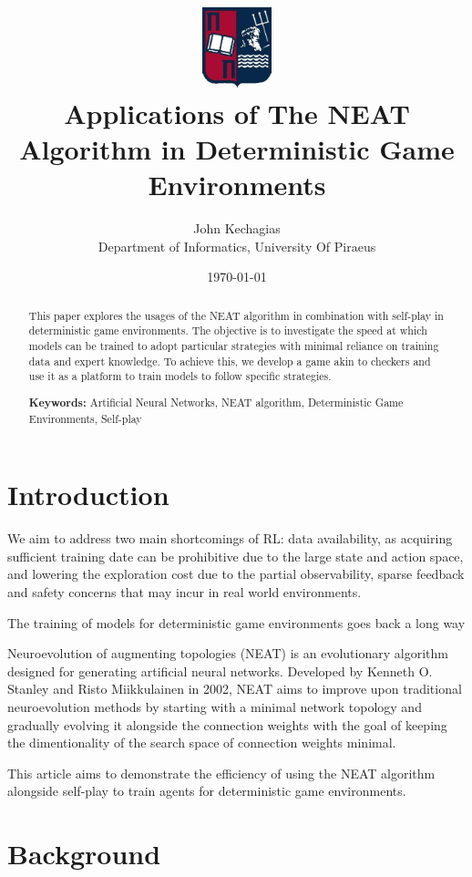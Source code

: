 \documentclass[letterpaper, 12pt]{article}
\title{
  \includegraphics[width=2cm]{unipi_logo.png}\\[1cm]
  Applications of The NEAT Algorithm in Deterministic Game Environments
}
\date{\today}
\author{John Kechagias\\ Department of Informatics, University Of Piraeus}
\begin{document}
\maketitle

\begin{abstract}
This paper explores the usages of the NEAT algorithm in combination with self-play in
deterministic game environments. The objective is to investigate the speed at which
models can be trained to adopt particular strategies with minimal reliance on training
data and expert knowledge. To achieve this, we develop a game akin to checkers and use
it as a platform to train models to follow specific strategies.

\parskip=0.5cm

\noindent\textbf{Keywords:} Artificial Neural Networks, NEAT algorithm, Deterministic
Game Environments, Self-play
\end{abstract}

\section*{Introduction}
We aim to address two main shortcomings of RL: data availability, as acquiring sufficient
training date can be prohibitive due to the large state and action space, and lowering the
exploration cost due to the partial observability, sparse feedback and safety concerns that
may incur in real world environments.

The training of models for deterministic game environments goes back a long way

Neuroevolution of augmenting topologies (NEAT) \cite{stanley:ec02} is an evolutionary
algorithm designed for generating artificial neural networks. Developed by Kenneth O.
Stanley and Risto Miikkulainen in 2002, NEAT aims to improve upon traditional
neuroevolution methods by starting with a minimal network topology and gradually
evolving it alongside the connection weights with the goal of keeping the dimentionality
of the search space of connection weights minimal.

This article aims to demonstrate the efficiency of using the NEAT algorithm alongside
self-play to train agents for deterministic game environments.

\section*{Background}
\end{document}
